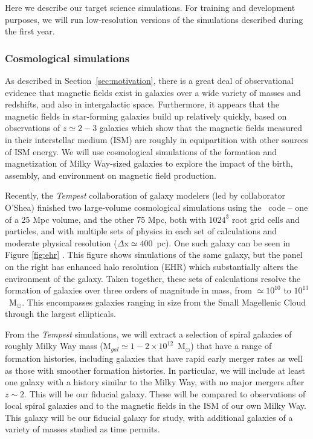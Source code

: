 Here we describe our target science simulations.  For training and development
purposes, we will run low-resolution versions of the simulations described
during the first year.  

\subsubsection{Cosmological simulations}
\label{sec:cosmo_sims}
\vspace{-2mm}

As described in Section~\ref{sec:motivation}, there is a great deal of
observational evidence that magnetic fields exist in galaxies over a
wide variety of masses and redshifts, and also in intergalactic space.
Furthermore, it appears that the magnetic fields in star-forming
galaxies build up relatively quickly, based on observations of $z
\simeq 2-3$ galaxies which show that the magnetic fields measured in
their interstellar medium (ISM) are roughly in equipartition with
other sources of ISM energy.  
We will use cosmological simulations of the formation and magnetization of Milky Way-sized galaxies to explore 
the impact of the birth, assembly, and environment on magnetic field production.

Recently, the \emph{Tempest} collaboration of galaxy modelers
(led by collaborator O'Shea) finished two 
large-volume cosmological simulations using the \enzo\ code -- one of
a 25 Mpc volume, and the other 75 Mpc, both with $1024^3$ root grid
cells and particles, and with multiple sets of physics in each set of
calculations and moderate physical resolution ($\Delta \mathrm{x} \simeq
400$~pc).  One such galaxy can be seen in Figure \ref{fig:ehr}
\citep{Hummels19}.  This figure
shows simulations of the same galaxy, but the panel on the right has enhanced
halo resolution (EHR) which substantially alters the environment of the galaxy.
Taken together, these sets of calculations resolve the
formation of galaxies over three orders of magnitude in mass, from
$\simeq 10^{10}$ to $10^{13}$~M$_\odot$. This encompasses galaxies
ranging in size from the Small Magellenic Cloud through the largest
ellipticals.  

From the \emph{Tempest} simulations, we will extract a selection of 
 spiral galaxies of roughly Milky Way mass (M$_{gal} \simeq 1-2 \times
10^{12}$~M$_\odot$) that have a range of formation histories,
including galaxies that have rapid early merger rates as well as those
with smoother formation histories.  In particular, we will include at least one galaxy
with a history similar to the Milky Way, with no major
mergers after $z \sim 2$.  This will be our fiducial galaxy.
These will be compared to observations of
local spiral galaxies \cite[e.g.,][]{2014arXiv1411.1386V} and to the
magnetic fields in the ISM of our own Milky Way.  This galaxy will be our
fiducial galaxy for study, with additional galaxies of a variety of masses
studied as time permits.


